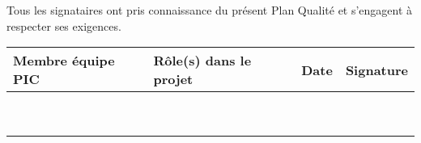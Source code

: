 Tous les signataires ont pris connaissance du présent Plan Qualité et s'engagent à respecter ses exigences. \\
	
	\vspace{1cm}

\begin{tabular}[h]{|p{}|p{}|p{}|p{}|}
	\hline
	
	\cellcolor{gray!40}Membre équipe PIC & \cellcolor{gray!40}Rôle(s) dans le projet & \cellcolor{gray!40}Date & \cellcolor{gray!40}Signature \\\hline
	\Sergi 		& \CP 				&  &  \\\hline
	\Pierre 		& \RQ \newline \CPA 	&  &  \\\hline
	\Michel 		& \D \newline \RD 	&  &  \\\hline
	\Kafui 		& \D \newline \RQA 	&  &  \\\hline
	\Matthieu 	& \D \newline \RRS 	&  &  \\\hline
	\Mathieu 	& \D \newline \RGC 	&  &  \\\hline
	\Florian 	& \D \newline \RS	&  &  \\\hline
	\Melissa 	& \D 				&  &  \\\hline
	\Julie		& \D 				&  &  \\\hline
\end{tabular}
